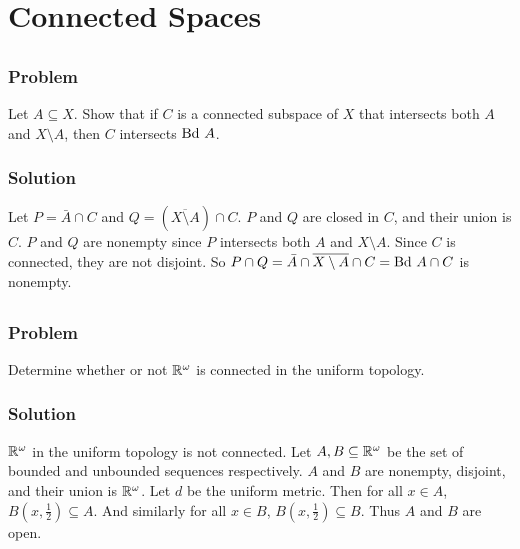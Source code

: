 \setcounter{section}{22} %
\section{Connected Spaces}
\label{sec-connected}
 

\setcounter{subsection}{5} %
\subsection{}

\subsubsection{Problem}
Let $A \subseteq X$. Show that if $C$ is a connected subspace of $X$ that intersects both $A$ and $X \setminus A$, then $C$ intersects $\mathrm{Bd\ } A$.

\subsubsection{Solution}
Let $P = \bar A \cap C$ and $Q = (\overline{X \setminus A}) \cap C$. $P$ and $Q$ are closed in $C$, and their union is $C$. $P$ and $Q$ are nonempty since $P$ intersects both $A$ and $X \setminus A$. Since $C$ is connected, they are not disjoint. So $P \cap Q = \bar A \cap \overline{X \setminus A} \cap C = \mathrm{Bd\ } A \cap C$ is nonempty.


\setcounter{subsection}{7} %
\subsection{}

\subsubsection{Problem}
Determine whether or not $\mathbb R^\omega$ is connected in the uniform topology.

\subsubsection{Solution}
$\mathbb R^\omega$ in the uniform topology is not connected. Let $A, B \subseteq \mathbb R^\omega$ be the set of bounded and unbounded sequences respectively. $A$ and $B$ are nonempty, disjoint, and their union is $\mathbb R^\omega$. Let $d$ be the uniform metric. Then for all $x \in A$, $B(x, \frac12) \subseteq A$. And similarly for all $x \in B$, $B(x, \frac12) \subseteq B$. Thus $A$ and $B$ are open.
